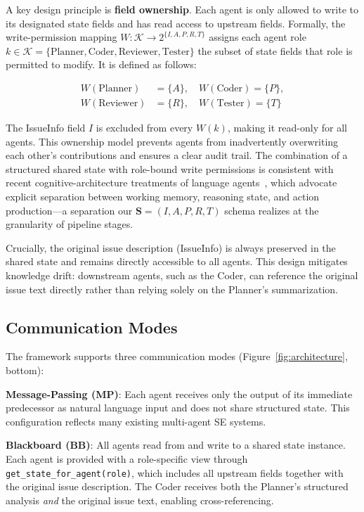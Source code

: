 \documentclass{ieeeaccess}
\begin{document}
A key design principle is \textbf{field ownership}. Each agent is only allowed to write to its designated state fields and has read access to upstream fields. Formally, the write-permission mapping $W : \mathcal{K} \to 2^{\{I,A,P,R,T\}}$ assigns each agent role $k \in \mathcal{K} = \{\text{Planner}, \text{Coder}, \text{Reviewer}, \text{Tester}\}$ the subset of state fields that role is permitted to modify. It is defined as follows:

\begin{align*}
W(\text{Planner}) &= \{A\}, \quad W(\text{Coder}) = \{P\}, \\
W(\text{Reviewer}) &= \{R\}, \quad W(\text{Tester}) = \{T\}
\end{align*}

The IssueInfo field $I$ is excluded from every $W(k)$, making it read-only for all agents. This ownership model prevents agents from inadvertently overwriting each other's contributions and ensures a clear audit trail. The combination of a structured shared state with role-bound write permissions is consistent with recent cognitive-architecture treatments of language agents~\cite{sumers2024cognitive}, which advocate explicit separation between working memory, reasoning state, and action production---a separation our $\mathbf{S} = (I, A, P, R, T)$ schema realizes at the granularity of pipeline stages.

Crucially, the original issue description (IssueInfo) is always preserved in the shared state and remains directly accessible to all agents. This design mitigates knowledge drift: downstream agents, such as the Coder, can reference the original issue text directly rather than relying solely on the Planner's summarization.

\subsection{Communication Modes}
\label{sec:comm-modes}

The framework supports three communication modes (Figure~\ref{fig:architecture}, bottom):

\textbf{Message-Passing (MP)}: Each agent receives only the output of its immediate predecessor as natural language input and does not share structured state. This configuration reflects many existing multi-agent SE systems.

\textbf{Blackboard (BB)}: All agents read from and write to a shared state instance. Each agent is provided with a role-specific view through \texttt{get\_state\_for\_agent(role)}, which includes all upstream fields together with the original issue description. The Coder receives both the Planner's structured analysis \emph{and} the original issue text, enabling cross-referencing.
\end{document}
